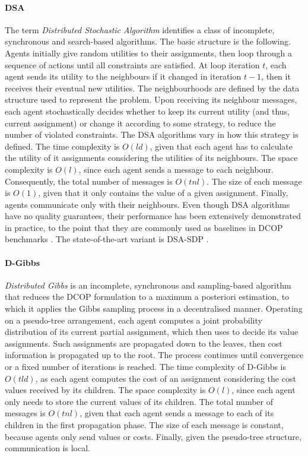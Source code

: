 \paragraph{DSA}\label{sec:dsa}

The term \emph{Distributed Stochastic Algorithm} \cite{zhang2005} identifies a class of
incomplete, synchronous and search-based algorithms. The basic structure is the
following. Agents initially give random utilities to their assignments, then loop
through a sequence of actions until all constraints are satisfied. At loop iteration $t$,
each agent sends its utility to the neighbours if it changed in iteration $t-1$, then it
receives their eventual new utilities. The neighbourhoods are defined by the data
structure used to represent the problem. Upon receiving its neighbour messages, each agent
stochastically decides whether to keep its current utility (and thus, current assignment)
or change it according to some strategy, to reduce the number of violated constraints. The
DSA algorithms vary in how this strategy is defined.
The time complexity is $O(ld)$, given that each agent has to calculate the utility of it
assignments considering the utilities of its neighbours. The space complexity is $O(l)$,
since each agent sends a message to each neighbour. Consequently, the total
number of messages is $O(tnl)$. The size of each message is $O(1)$, given that it only
contains the value of a given assignment. Finally, agents communicate only with their
neighbours.
Even though DSA algorithms have no quality guarantees, their performance has been
extensively demonstrated in practice, to the point that they are commonly used as
baselines in DCOP benchmarks \cite[Section $4.4.2$]{fioretto2018survey}. The
state-of-the-art variant is DSA-SDP \cite{zivan2014}.

\paragraph{D-Gibbs}

\emph{Distributed Gibbs} \cite{nguyen2019} is an incomplete, synchronous and
sampling-based algorithm that reduces the DCOP formulation to a maximum a posteriori
estimation, to which it applies the Gibbs sampling process \cite{geman1993} in a
decentralised manner. Operating on a pseudo-tree arrangement, each agent computes a joint
probability distribution of its current partial assignment, which then uses to decide its
value assignments. Such assignments are propagated down to the leaves, then cost
information is propagated up to the root. The process continues until convergence or a
fixed number of iterations is reached.
The time complexity of D-Gibbs is $O(tld)$, as each agent computes the cost of an
assignment considering the cost values received by its children. The space complexity is
$O(l)$, since each agent only needs to store the current values of its children. The total
number of messages is $O(tnl)$, given that each agent sends a message to each of its
children in the first propagation phase. The size of each message is constant, because
agents only send values or costs. Finally, given the pseudo-tree structure,
communication is local.

